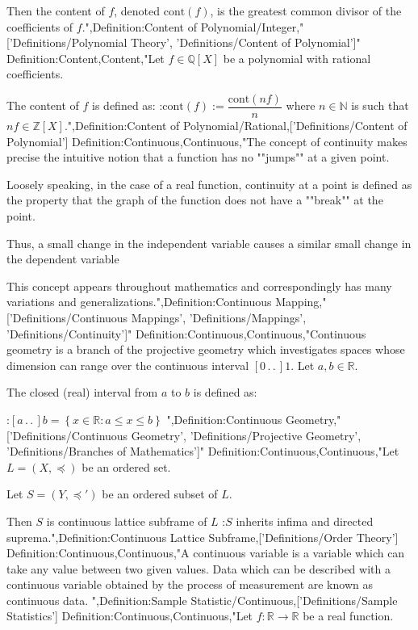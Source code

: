 Then the content of $f$, denoted $\mathrm {cont} \left( f \right)$, is the greatest common divisor of the coefficients of $f$.",Definition:Content of Polynomial/Integer,"['Definitions/Polynomial Theory', 'Definitions/Content of Polynomial']"
Definition:Content,Content,"Let $f \in \mathbb Q \left[ X \right]$ be a polynomial with rational coefficients.


The content of $f$ is defined as:
:$\mathrm {cont} \left( f \right) := \dfrac {\mathrm {cont} \left( n f \right) } n$
where $n \in \mathbb N$ is such that $n f \in \mathbb Z \left[ X \right]$.",Definition:Content of Polynomial/Rational,['Definitions/Content of Polynomial']
Definition:Continuous,Continuous,"The concept of continuity makes precise the intuitive notion that a function has no ""jumps"" at a given point.

Loosely speaking, in the case of a real function, continuity at a point is defined as the property that the graph of the function does not have a ""break"" at the point.

Thus, a small change in the independent variable causes a similar small change in the dependent variable

This concept appears throughout mathematics and correspondingly has many variations and generalizations.",Definition:Continuous Mapping,"['Definitions/Continuous Mappings', 'Definitions/Mappings', 'Definitions/Continuity']"
Definition:Continuous,Continuous,"Continuous geometry is a branch of the projective geometry which investigates spaces whose dimension can range over the continuous interval $\left[ 0 \,.\,.\,   \right]1$.
Let $a, b \in \mathbb R$.

The closed (real) interval from $a$ to $b$ is defined as:

:$\left[ a \,.\,.\,   \right]b = \left\lbrace x \in \mathbb R: a \le x \le b \right\rbrace$
",Definition:Continuous Geometry,"['Definitions/Continuous Geometry', 'Definitions/Projective Geometry', 'Definitions/Branches of Mathematics']"
Definition:Continuous,Continuous,"Let $L = \left({X, \preceq}\right)$ be an ordered set.

Let $S = \left({Y, \preceq'}\right)$ be an ordered subset of $L$.


Then $S$ is continuous lattice subframe of $L$ 
:$S$ inherits infima and directed suprema.",Definition:Continuous Lattice Subframe,['Definitions/Order Theory']
Definition:Continuous,Continuous,"A continuous variable is a variable which can take any value between two given values.
Data which can be described with a continuous variable obtained by the process of measurement are known as continuous data.
",Definition:Sample Statistic/Continuous,['Definitions/Sample Statistics']
Definition:Continuous,Continuous,"Let $f: \mathbb R \to \mathbb R$ be a real function.



